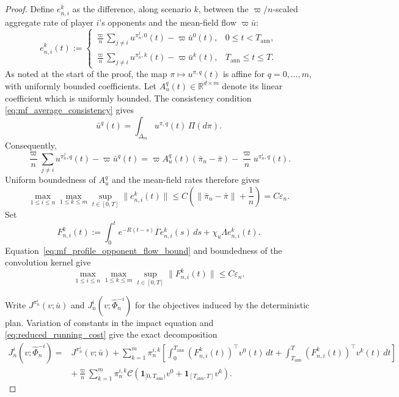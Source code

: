 \documentclass[12pt]{article}
\numberwithin{equation}{section}
\theoremstyle{definition}
\begin{document}
\begin{proof}
Define
\(e_{n,i}^k\) as the difference, along scenario \(k\), between the
\(\varpi/n\)-scaled aggregate rate of player \(i\)'s opponents and the
mean-field flow \(\varpi\bar u\):
\[
e_{n,i}^{k}(t)
:=
\begin{cases}
\displaystyle
\frac{\varpi}{n}\sum_{j\ne i}u^{\pi_n^j,0}(t)-\varpi\bar u^0(t),
&0\leq t<T_{\mathrm{ann}},\\[6pt]
\displaystyle
\frac{\varpi}{n}\sum_{j\ne i}u^{\pi_n^j,k}(t)-\varpi\bar u^k(t),
&T_{\mathrm{ann}}\leq t\leq T.
\end{cases}
\]
As noted at the start of the proof, the map
\(\pi\mapsto u^{\pi,q}(t)\) is affine for \(q=0,\ldots,m\), with uniformly
bounded coefficients. Let \(A_u^q(t)\in\mathbb R^{d\times m}\) denote its
linear coefficient which is uniformly bounded. The consistency condition
\eqref{eq:mf_average_consistency} gives
\[
\bar u^q(t)
=
\int_{\Delta_m}u^{\pi,q}(t)\,\Pi(d\pi).
\]
Consequently,
\[
\frac{\varpi}{n}\sum_{j\ne i}u^{\pi_n^j,q}(t)-\varpi\bar u^q(t)
=
\varpi A_u^q(t)(\bar\pi_n-\bar\pi)
-\frac{\varpi}{n} u^{\pi_n^i,q}(t).
\]
Uniform boundedness of \(A_u^q\) and the mean-field rates therefore gives
\begin{equation}\label{eq:mf_profile_opponent_flow_bound}
\max_{1\leq i\leq n}
\max_{1\leq k\leq m}
\sup_{t\in[0,T]}
\|e_{n,i}^{k}(t)\|
\leq
C\left(
\|\bar\pi_n-\bar\pi\|+\frac1n
\right)
=C\varepsilon_n.
\end{equation}
Set
\[
F_{n,i}^k(t)
:=
\int_0^t e^{-R(t-s)}\Gamma e_{n,i}^k(s)\,ds
+\chi_u\Lambda e_{n,i}^k(t).
\]
Equation~\eqref{eq:mf_profile_opponent_flow_bound} and boundedness of the
convolution kernel give
\[
\max_{1\leq i\leq n}
\max_{1\leq k\leq m}
\sup_{t\in[0,T]}
\|F_{n,i}^k(t)\|
\leq
C\varepsilon_n.
\]

Write \(J^{\pi_n^i}(v;\bar u)\) and
\(J_n^i(v;\widehat\Phi_n^{-i})\) for the objectives induced by the
deterministic plan. Variation of constants in the impact equation and
\eqref{eq:reduced_running_cost} give the exact decomposition
\[
\begin{aligned}
J_n^i(v;\widehat\Phi_n^{-i})
={}&
J^{\pi_n^i}(v;\bar u)
+
\sum_{k=1}^m\pi_n^{i,k}
\left[
\int_0^{T_{\mathrm{ann}}}
\left(F_{n,i}^k(t)\right)^\top v^0(t)\,dt
+
\int_{T_{\mathrm{ann}}}^T
\left(F_{n,i}^k(t)\right)^\top v^k(t)\,dt
\right]
\\
&+
\frac{\varpi}{n}
\sum_{k=1}^m\pi_n^{i,k}
\mathcal C\left(
\mathbf 1_{[0,T_{\mathrm{ann}})}v^0
+\mathbf 1_{[T_{\mathrm{ann}},T]}v^k
\right).
\end{aligned}
\]


\end{proof}
\end{document}
